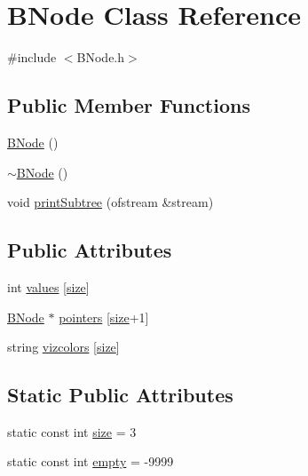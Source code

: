 \hypertarget{class_b_node}{\section{B\+Node Class Reference}
\label{class_b_node}
}


{\ttfamily \#include $<$B\+Node.\+h$>$}

\subsection*{Public Member Functions}
\begin{DoxyCompactItemize}
\item 
\hyperlink{class_b_node_a4c41333d8fc73a6c9f37f77ae7418528}{B\+Node} ()
\item 
\hyperlink{class_b_node_a2be9ef05bc8dc34f17982736a38e1adf}{$\sim$\+B\+Node} ()
\item 
void \hyperlink{class_b_node_ae9d4520fc66e1b6cf12828124e6ac4ea}{print\+Subtree} (ofstream \&stream)
\end{DoxyCompactItemize}
\subsection*{Public Attributes}
\begin{DoxyCompactItemize}
\item 
int \hyperlink{class_b_node_a68da613c234fda105be9e77ae198f305}{values} \mbox{[}\hyperlink{class_b_node_a43b413611bf924cac0a30d8e343157a2}{size}\mbox{]}
\item 
\hyperlink{class_b_node}{B\+Node} $\ast$ \hyperlink{class_b_node_a4be31193c63fe1a8893a0582b39c2d44}{pointers} \mbox{[}\hyperlink{class_b_node_a43b413611bf924cac0a30d8e343157a2}{size}+1\mbox{]}
\item 
string \hyperlink{class_b_node_afaeb8892e5f2b35cfef5f07ba11a36d3}{vizcolors} \mbox{[}\hyperlink{class_b_node_a43b413611bf924cac0a30d8e343157a2}{size}\mbox{]}
\end{DoxyCompactItemize}
\subsection*{Static Public Attributes}
\begin{DoxyCompactItemize}
\item 
static const int \hyperlink{class_b_node_a43b413611bf924cac0a30d8e343157a2}{size} = 3
\item 
static const int \hyperlink{class_b_node_a85dc0d85a7353df2f327d825481d0406}{empty} = -\/9999
\end{DoxyCompactItemize}



